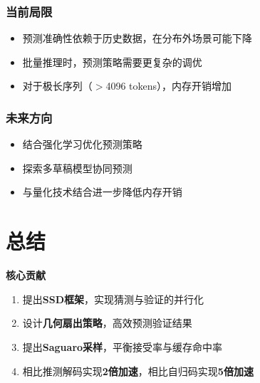 \documentclass[11pt,a4paper]{article}
\newcommand{\hlblue}[1]{\textcolor{primaryblue}{\textbf{#1}}}
\newcommand{\hlpurple}[1]{\textcolor{primarypurple}{\textbf{#1}}}
\newcommand{\hlteal}[1]{\textcolor{primaryteal}{\textbf{#1}}}
\newcommand{\hlorange}[1]{\textcolor{accentorange}{\textbf{#1}}}
\begin{document}
\subsubsection{当前局限}

\begin{warningbox}[局限性]
  \begin{itemize}
    \item 预测准确性依赖于历史数据，在分布外场景可能下降
    \item 批量推理时，预测策略需要更复杂的调优
    \item 对于极长序列（$>$4096 tokens），内存开销增加
  \end{itemize}
\end{warningbox}

\subsubsection{未来方向}

\begin{innovationbox}[未来方向]
  \begin{itemize}
    \item 结合强化学习优化预测策略
    \item 探索多草稿模型协同预测
    \item 与量化技术结合进一步降低内存开销
  \end{itemize}
\end{innovationbox}

\newpage

\section{总结}

\begin{titlebox}
  \textbf{核心贡献}
  \begin{enumerate}
    \item 提出\hlblue{SSD框架}，实现猜测与验证的并行化
    \item 设计\hlpurple{几何扇出策略}，高效预测验证结果
    \item 提出\hlteal{Saguaro采样}，平衡接受率与缓存命中率
    \item 相比推测解码实现\hlorange{2倍加速}，相比自归码实现\hlorange{5倍加速}
  \end{enumerate}
\end{titlebox}
\end{document}
